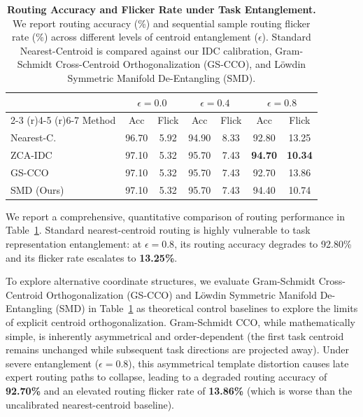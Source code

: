 \begin{table}[t]
\caption{\textbf{Routing Accuracy and Flicker Rate under Task Entanglement.} We report routing accuracy (\%) and sequential sample routing flicker rate (\%) across different levels of centroid entanglement ($\epsilon$). Standard Nearest-Centroid is compared against our IDC calibration, Gram-Schmidt Cross-Centroid Orthogonalization (GS-CCO), and L{\"o}wdin Symmetric Manifold De-Entangling (SMD).}
\label{tab:entanglement_flicker}
\vskip 0.1in
\begin{center}
\begin{scriptsize}
\begin{sc}
\setlength{\tabcolsep}{1.5pt}
\begin{tabular}{lcccccc}
\toprule
& \multicolumn{2}{c}{$\epsilon = 0.0$} & \multicolumn{2}{c}{$\epsilon = 0.4$} & \multicolumn{2}{c}{$\epsilon = 0.8$} \\
\cmidrule(r){2-3} \cmidrule(r){4-5} \cmidrule(r){6-7}
Method & Acc & Flick & Acc & Flick & Acc & Flick \\
\midrule
Nearest-C. & 96.70 & 5.92 & 94.90 & 8.33 & 92.80 & 13.25 \\
ZCA-IDC & 97.10 & 5.32 & 95.70 & 7.43 & \textbf{94.70} & \textbf{10.34} \\
GS-CCO & 97.10 & 5.32 & 95.70 & 7.43 & 92.70 & 13.86 \\
SMD (Ours) & 97.10 & 5.32 & 95.70 & 7.43 & 94.40 & 10.74 \\
\bottomrule
\end{tabular}
\end{sc}
\end{scriptsize}
\end{center}
\vskip -0.1in
\end{table}

We report a comprehensive, quantitative comparison of routing performance in Table~\ref{tab:entanglement_flicker}. Standard nearest-centroid routing is highly vulnerable to task representation entanglement: at $\epsilon=0.8$, its routing accuracy degrades to 92.80\% and its flicker rate escalates to \textbf{13.25\%}. 

To explore alternative coordinate structures, we evaluate Gram-Schmidt Cross-Centroid Orthogonalization (GS-CCO) and L{\"o}wdin Symmetric Manifold De-Entangling (SMD) in Table~\ref{tab:entanglement_flicker} as theoretical control baselines to explore the limits of explicit centroid orthogonalization. Gram-Schmidt CCO, while mathematically simple, is inherently asymmetrical and order-dependent (the first task centroid remains unchanged while subsequent task directions are projected away). Under severe entanglement ($\epsilon = 0.8$), this asymmetrical template distortion causes late expert routing paths to collapse, leading to a degraded routing accuracy of \textbf{92.70\%} and an elevated routing flicker rate of \textbf{13.86\%} (which is worse than the uncalibrated nearest-centroid baseline). 

